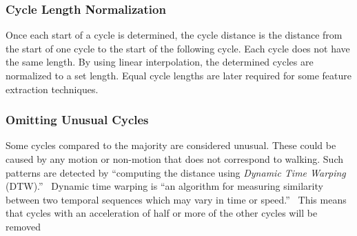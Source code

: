 \documentclass{sig-alternate}
\begin{document}
\subsubsection{Cycle Length Normalization}
Once each start of a cycle is determined, the cycle distance is the distance from the start of one cycle to the start of the following cycle. Each cycle does not have the same length. By using linear interpolation, the determined cycles are normalized to a set length. Equal cycle lengths are later required for some feature extraction techniques. 
\subsubsection{Omitting Unusual Cycles}
Some cycles compared to the majority are considered unusual. These could be caused by any motion or non-motion that does not correspond to walking. Such patterns are detected by ``computing the distance using \textit{Dynamic Time Warping} (DTW).''~\cite{Muaaz:2013} Dynamic time warping is ``an algorithm for measuring similarity between two temporal sequences which may vary in time or speed.''~\cite{wiki2:2014} This means that cycles with an acceleration of half or more of the other cycles will be removed
\end{document}

